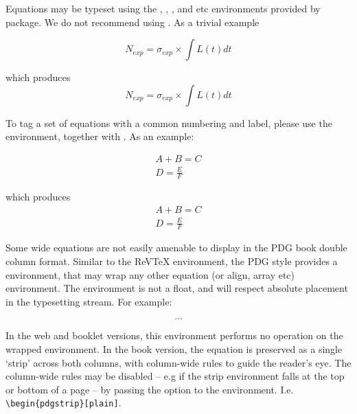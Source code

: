Equations may be typeset using the , , , and  etc environments provided by  package. 
We do not recommend using . As a trivial example
\begin{verbtex}
\begin{equation}
\label{BASENAME:eq:equation}
	N_{exp} = \sigma_{exp} \times \int L(t) dt
\end{equation}
\end{verbtex}
which produces
\begin{equation}
	N_{exp} = \sigma_{exp} \times \int L(t) dt
\end{equation}


To tag a set of equations with a common numbering and label, please use the  environment, together with .
As an example:
\begin{verbtex}
\begin{subequations}
	\label{BASENAME:eq:equation1}
	\begin{align}
		A + B = C\\
		D= \frac{E}{F}  
	\end{align}
\end{subequations}
\end{verbtex}
which produces
\begin{subequations}
\begin{align}
	A + B = C\\
	D= \frac{E}{F}  
\end{align}
\end{subequations}


Some wide equations are not easily amenable to display in the PDG book double column format. 
Similar to the ReVTeX  environment, the PDG style provides a  environment, that may wrap any other equation (or align, array etc) environment. 
The  environment is not a float, and will respect absolute placement in the typesetting stream. 
For example:
\begin{verbtex}
	\begin{pdgstrip}
		\begin{equation} %
		...

		\end{equation}
	\end{pdgstrip}
\end{verbtex}
In the web and booklet versions, this environment performs no operation on the wrapped environment. 
In the book version, the equation is preserved as a single `strip' across both columns, with column-wide rules to guide the reader's eye. 
The column-wide rules may be disabled -- e.g if the strip environment falls at the top or bottom of a page --  by passing the option  to the  environment. I.e. 
\lstinline!\begin{pdgstrip}[plain]!.

